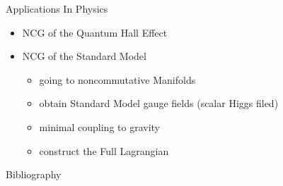 \documentclass[fleqn]{beamer}
\begin{document}
    \begin{frame}{Applications In Physics}
        \begin{itemize}
            \item NCG of the Quantum Hall Effect
            \item NCG of the Standard Model
                \begin{itemize}
                    \item[\bullet] going to noncommutative Manifolds
                    \item[\bullet] obtain Standard Model gauge fields (scalar Higgs filed)
                    \item[\bullet] minimal coupling to gravity
                    \item[\bullet] construct the Full Lagrangian
                \end{itemize}
        \end{itemize}
    \end{frame}

    \begin{frame}{Bibliography}
        \nocite{ncgwalter}
        \nocite{liealgebra}
        \nocite{ncg4pages}
        \nocite{ncgshort}
        \printbibliography
    \end{frame}
\end{document}
